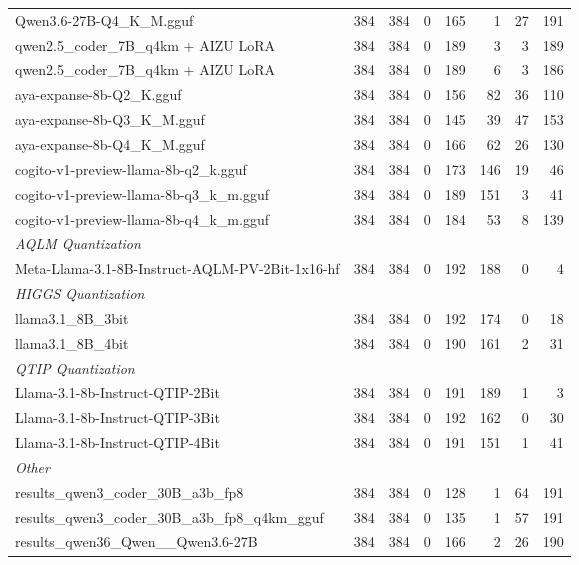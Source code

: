 \begin{table}[htbp]
{\begin{tabular}{lrrrrrrr}
    Qwen3.6-27B-Q4\_K\_M.gguf & 384 & 384 & 0 & 165 & 1 & 27 & 191 \\
    qwen2.5\_coder\_7B\_q4km + AIZU LoRA & 384 & 384 & 0 & 189 & 3 & 3 & 189 \\
    qwen2.5\_coder\_7B\_q4km + AIZU LoRA & 384 & 384 & 0 & 189 & 6 & 3 & 186 \\
    aya-expanse-8b-Q2\_K.gguf & 384 & 384 & 0 & 156 & 82 & 36 & 110 \\
    aya-expanse-8b-Q3\_K\_M.gguf & 384 & 384 & 0 & 145 & 39 & 47 & 153 \\
    aya-expanse-8b-Q4\_K\_M.gguf & 384 & 384 & 0 & 166 & 62 & 26 & 130 \\
    cogito-v1-preview-llama-8b-q2\_k.gguf & 384 & 384 & 0 & 173 & 146 & 19 & 46 \\
    cogito-v1-preview-llama-8b-q3\_k\_m.gguf & 384 & 384 & 0 & 189 & 151 & 3 & 41 \\
    cogito-v1-preview-llama-8b-q4\_k\_m.gguf & 384 & 384 & 0 & 184 & 53 & 8 & 139 \\
    \midrule
    \multicolumn{8}{l}{\textit{AQLM Quantization}} \\
    \midrule
    Meta-Llama-3.1-8B-Instruct-AQLM-PV-2Bit-1x16-hf & 384 & 384 & 0 & 192 & 188 & 0 & 4 \\
    \midrule
    \multicolumn{8}{l}{\textit{HIGGS Quantization}} \\
    \midrule
    llama3.1\_8B\_3bit & 384 & 384 & 0 & 192 & 174 & 0 & 18 \\
    llama3.1\_8B\_4bit & 384 & 384 & 0 & 190 & 161 & 2 & 31 \\
    \midrule
    \multicolumn{8}{l}{\textit{QTIP Quantization}} \\
    \midrule
    Llama-3.1-8b-Instruct-QTIP-2Bit & 384 & 384 & 0 & 191 & 189 & 1 & 3 \\
    Llama-3.1-8b-Instruct-QTIP-3Bit & 384 & 384 & 0 & 192 & 162 & 0 & 30 \\
    Llama-3.1-8b-Instruct-QTIP-4Bit & 384 & 384 & 0 & 191 & 151 & 1 & 41 \\
    \midrule
    \multicolumn{8}{l}{\textit{Other}} \\
    \midrule
    results\_qwen3\_coder\_30B\_a3b\_fp8 & 384 & 384 & 0 & 128 & 1 & 64 & 191 \\
    results\_qwen3\_coder\_30B\_a3b\_fp8\_q4km\_gguf & 384 & 384 & 0 & 135 & 1 & 57 & 191 \\
    results\_qwen36\_Qwen\_\_Qwen3.6-27B & 384 & 384 & 0 & 166 & 2 & 26 & 190 \\
    \bottomrule
  \end{tabular}
  }
\end{table}

